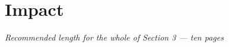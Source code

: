 \documentclass[a4paper,11pt,twoside]{scrreprt}
\newcommand{\commissionhints}[1]{\small \textit{#1}}
\begin{document}






%   


%   



%   


\chapter{Impact}\label{chap:impact}
\commissionhints{Recommended length for the whole of Section 3 --- ten
  pages}





\end{document}
